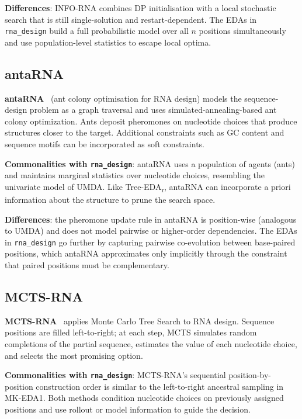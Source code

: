 \documentclass[11pt,a4paper]{article}
\begin{document}
\textbf{Differences}: INFO-RNA combines DP initialisation with a local
stochastic search that is still single-solution and restart-dependent. The
EDAs in \texttt{rna\_design} build a full probabilistic model over all $n$
positions simultaneously and use population-level statistics to escape local
optima.

\subsection{antaRNA}

\textbf{antaRNA}~\cite{doelker2015antarna} (ant colony optimisation for RNA
design) models the sequence-design problem as a graph traversal and uses
simulated-annealing-based ant colony optimization. Ants deposit pheromones
on nucleotide choices that produce structures closer to the target. Additional
constraints such as GC content and sequence motifs can be incorporated as
soft constraints.

\textbf{Commonalities with \texttt{rna\_design}}: antaRNA uses a population
of agents (ants) and maintains marginal statistics over nucleotide choices,
resembling the univariate model of UMDA. Like Tree-EDA\textsubscript{r},
antaRNA can incorporate a priori information about the structure to prune the
search space.

\textbf{Differences}: the pheromone update rule in antaRNA is position-wise
(analogous to UMDA) and does not model pairwise or higher-order dependencies.
The EDAs in \texttt{rna\_design} go further by capturing pairwise
co-evolution between base-paired positions, which antaRNA approximates only
implicitly through the constraint that paired positions must be
complementary.

\subsection{MCTS-RNA}

\textbf{MCTS-RNA}~\cite{yang2017mcts} applies Monte Carlo Tree Search to RNA
design. Sequence positions are filled left-to-right; at each step, MCTS
simulates random completions of the partial sequence, estimates the value
of each nucleotide choice, and selects the most promising option.

\textbf{Commonalities with \texttt{rna\_design}}: MCTS-RNA's sequential
position-by-position construction order is similar to the left-to-right
ancestral sampling in MK-EDA1. Both methods condition nucleotide choices on
previously assigned positions and use rollout or model information to guide
the decision.
\end{document}
